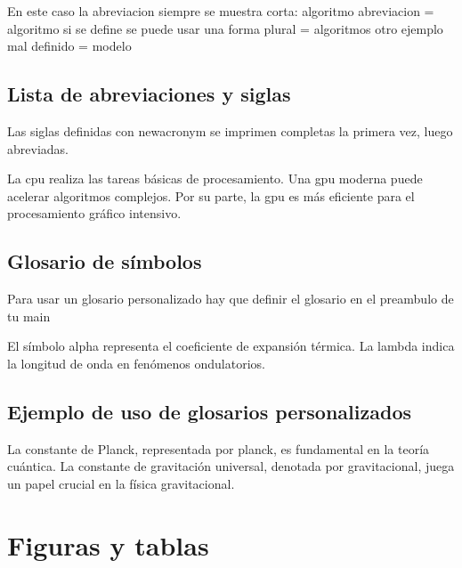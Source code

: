  
 En este caso la abreviacion siempre se muestra corta:
 algoritmo abreviacion = \gls{algoritmo} 
 si se define se puede usar una forma plural =  \glspl{algoritmo}  
 otro  ejemplo mal definido = \gls{modelo} 
 
 \subsection{Lista de abreviaciones y siglas}
 
 Las siglas definidas con newacronym se imprimen completas la primera vez, luego abreviadas.
 
 La \gls{cpu} realiza las tareas básicas de procesamiento.  
 Una \gls{gpu} moderna puede acelerar algoritmos complejos.
 Por su parte, la \gls{gpu} es más eficiente para el procesamiento gráfico intensivo.  
 
 \subsection{Glosario de símbolos}
  
 Para usar  un glosario personalizado hay que definir el glosario en el preambulo de tu main 

 El símbolo \gls{alpha} representa el coeficiente de expansión térmica.  
 La \gls{lambda} indica la longitud de onda en fenómenos ondulatorios.
 
 \subsection{Ejemplo de uso de glosarios personalizados}
 
 La constante de Planck, representada por \gls{planck}, es fundamental en la teoría cuántica.  
 La constante de gravitación universal, denotada por \gls{gravitacional}, juega un papel crucial en la física gravitacional.

 \clearpage 

 \clearpage %
 \section{Figuras y tablas}

